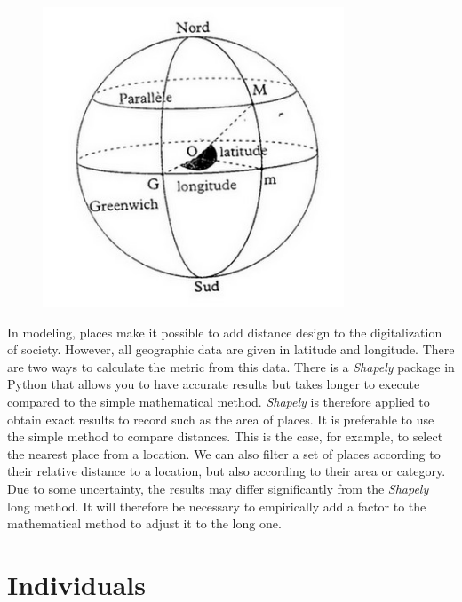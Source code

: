 \begin{figure}
  \centering
  \includegraphics[width=\linewidth]{Media/Geographie.png}
\end{figure}

In modeling, places make it possible to add
distance design to the digitalization of society. However, all geographic data are given in latitude and longitude. There are two ways to calculate the metric from this data. There is a \textit{Shapely} package in Python that allows you to have accurate results but takes longer to execute compared to the simple mathematical method. \textit{Shapely} is therefore applied to obtain exact results to record such as the area of places. It is preferable to use the simple method to compare distances. This is the case, for example, to select the nearest place from a location. We can also filter a set of places according to their relative distance to a location, but also according to their area or category. Due to some uncertainty, the results may differ significantly from the \textit{Shapely} long method. It will therefore be necessary to empirically add a factor to the mathematical method to adjust it to the long one.\\

\newpage

\section{Individuals}

